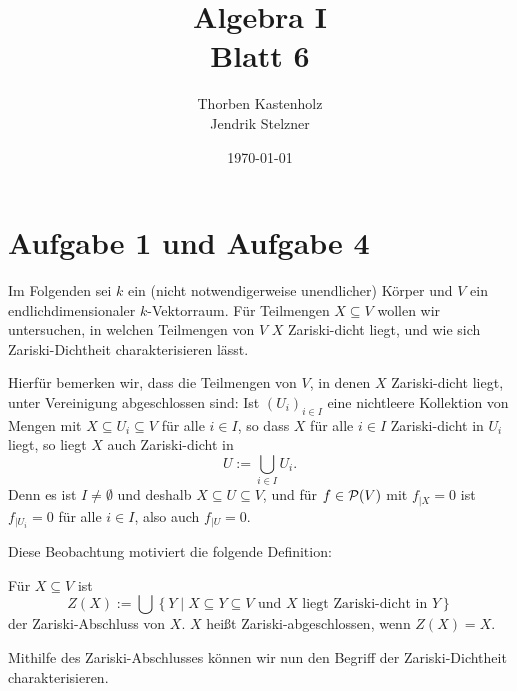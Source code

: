 \documentclass[a4paper,10pt]{article}
\title{\sc Algebra I \\ \Large Blatt 6}
\author{Thorben Kastenholz \\ Jendrik Stelzner}
\date{\today}
\begin{document}
\maketitle





\addtocounter{section}{1}
\section*{Aufgabe 1 und Aufgabe 4}
Im Folgenden sei $k$ ein (nicht notwendigerweise unendlicher) Körper und $V$ ein endlichdimensionaler $k$-Vektorraum. Für Teilmengen $X \subseteq V$ wollen wir untersuchen, in welchen Teilmengen von $V$ $X$ Zariski-dicht liegt, und wie sich Zariski-Dichtheit charakterisieren lässt.

Hierfür bemerken wir, dass die Teilmengen von $V$, in denen $X$ Zariski-dicht liegt, unter Vereinigung abgeschlossen sind: Ist $(U_i)_{i \in I}$ eine nichtleere Kollektion von Mengen mit $X \subseteq U_i \subseteq V$ für alle $i \in I$, so dass $X$ für alle $i \in I$ Zariski-dicht in $U_i$ liegt, so liegt $X$ auch Zariski-dicht in
\[
 U := \bigcup_{i \in I} U_i.
\]
Denn es ist $I \neq \emptyset$ und deshalb $X \subseteq U \subseteq V$, und für $f \in \mathcal{P}(V)$ mit $f_{|X} = 0$ ist $f_{|U_i} = 0$ für alle $i \in I$, also auch $f_{|U} = 0$.

Diese Beobachtung motiviert die folgende Definition:

\begin{defi}
 Für $X \subseteq V$ ist
 \[
  Z(X) := \bigcup \left\{ Y \mid X \subseteq Y \subseteq V \text{ und $X$ liegt Zariski-dicht in $Y$} \right\}
 \]
 der Zariski-Abschluss von $X$. $X$ heißt Zariski-abgeschlossen, wenn $Z(X) = X$.
\end{defi}


Mithilfe des Zariski-Abschlusses können wir nun den Begriff der Zariski-Dichtheit charakterisieren.
\end{document}
